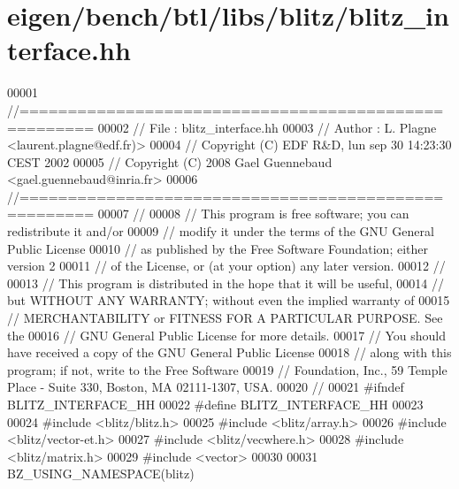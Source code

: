\hypertarget{eigen_2bench_2btl_2libs_2blitz_2blitz__interface_8hh_source}{}\section{eigen/bench/btl/libs/blitz/blitz\+\_\+interface.hh}
\label{eigen_2bench_2btl_2libs_2blitz_2blitz__interface_8hh_source}

\begin{DoxyCode}
00001 \textcolor{comment}{//=====================================================}
00002 \textcolor{comment}{// File   :  blitz\_interface.hh}
00003 \textcolor{comment}{// Author :  L. Plagne <laurent.plagne@edf.fr)>}
00004 \textcolor{comment}{// Copyright (C) EDF R&D,  lun sep 30 14:23:30 CEST 2002}
00005 \textcolor{comment}{// Copyright (C) 2008 Gael Guennebaud <gael.guennebaud@inria.fr>}
00006 \textcolor{comment}{//=====================================================}
00007 \textcolor{comment}{//}
00008 \textcolor{comment}{// This program is free software; you can redistribute it and/or}
00009 \textcolor{comment}{// modify it under the terms of the GNU General Public License}
00010 \textcolor{comment}{// as published by the Free Software Foundation; either version 2}
00011 \textcolor{comment}{// of the License, or (at your option) any later version.}
00012 \textcolor{comment}{//}
00013 \textcolor{comment}{// This program is distributed in the hope that it will be useful,}
00014 \textcolor{comment}{// but WITHOUT ANY WARRANTY; without even the implied warranty of}
00015 \textcolor{comment}{// MERCHANTABILITY or FITNESS FOR A PARTICULAR PURPOSE.  See the}
00016 \textcolor{comment}{// GNU General Public License for more details.}
00017 \textcolor{comment}{// You should have received a copy of the GNU General Public License}
00018 \textcolor{comment}{// along with this program; if not, write to the Free Software}
00019 \textcolor{comment}{// Foundation, Inc., 59 Temple Place - Suite 330, Boston, MA  02111-1307, USA.}
00020 \textcolor{comment}{//}
00021 \textcolor{preprocessor}{#ifndef BLITZ\_INTERFACE\_HH}
00022 \textcolor{preprocessor}{#define BLITZ\_INTERFACE\_HH}
00023 
00024 \textcolor{preprocessor}{#include <blitz/blitz.h>}
00025 \textcolor{preprocessor}{#include <blitz/array.h>}
00026 \textcolor{preprocessor}{#include <blitz/vector-et.h>}
00027 \textcolor{preprocessor}{#include <blitz/vecwhere.h>}
00028 \textcolor{preprocessor}{#include <blitz/matrix.h>}
00029 \textcolor{preprocessor}{#include <vector>}
00030 
00031 BZ\_USING\_NAMESPACE(blitz)

\end{DoxyCode}
